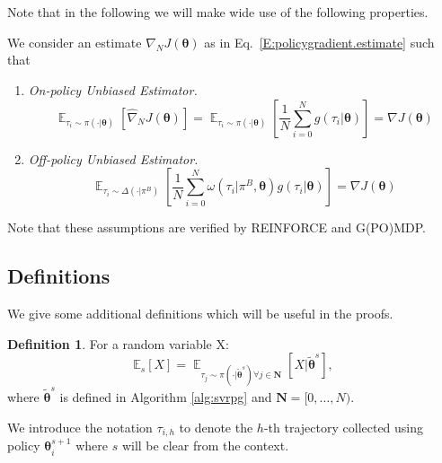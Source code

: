 \documentclass{article}
\theoremstyle{remark}
\theoremstyle{definition}
\newtheorem{definition}{Definition}[section]
\DeclareMathOperator*{\EV}{\mathbb{E}}
\newcommand{\EVV}[2][\ppvect \in \ppspace]{\EV_{#1}\left[{#2}\right]}
\newcommand{\vtheta}{\boldsymbol{\theta}}
\newcommand{\Es}[1]{\mathbb{E}_{s}\left[#1\right]}
\newcommand{\wt}[1]{\widetilde{#1}}
\newcommand{\wh}[1]{\widehat{#1}}
\begin{document}
Note that in the following we will make wide use of the following properties.
\begin{assumption}\label{asm:unbiasedness}
        We consider an estimate $\wh{\nabla}_N J(\vtheta)$ as in Eq.~\ref{E:policygradient.estimate} such that
\begin{enumerate}
        \item \textit{On-policy Unbiased Estimator.} 
                \[
                        \EVV[\tau_i \sim \pi(\cdot|\vtheta)]{\wh{\nabla}_N J(\vtheta)} = \EVV[\tau_i \sim \pi(\cdot|\vtheta)]{\frac{1}{N} \sum_{i=0}^N g(\tau_i|\vtheta)} = \nabla J(\vtheta)
                \]
        \item \textit{Off-policy Unbiased Estimator.}
                \[
        \EVV[\tau_i \sim \Delta(\cdot|\pi^B)]{\frac{1}{N} \sum_{i=0}^N \omega(\tau_i|\pi^B,\vtheta) g(\tau_i|\vtheta) } 
        = \nabla J(\vtheta) 
                \]
\end{enumerate}
\end{assumption}
Note that these assumptions are verified by REINFORCE and G(PO)MDP.

\subsection*{Definitions}
We give some additional definitions which will be useful in the proofs.

\begin{definition}
For a random variable X:
\[
	\Es{X} = \EVV[\tau_j\sim\pi(\cdot\vert\wt{\vtheta}^s)
		\forall j\in\mathbf{N}]{X\vert\wt{\vtheta}^s},
\]
where $\wt{\vtheta}^s$ is defined in Algorithm \ref{alg:svrpg} and $\mathbf{N} = [0,\dots,N)$.
\end{definition}

We introduce the notation $\tau_{i,h}$ to denote the $h$-th trajectory collected using policy $\vtheta^{s+1}_i$ where $s$ will be clear from the context.
\end{document}
